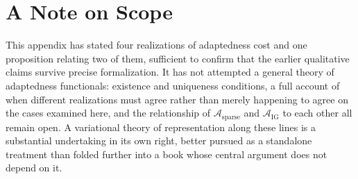 \documentclass[11pt,fleqn]{book}
\numberwithin{equation}{chapter}
\theoremstyle{plain}
\theoremstyle{definition}
\theoremstyle{remark}
\begin{document}
\section{A Note on Scope}

This appendix has stated four realizations of adaptedness cost and one proposition relating two of them, sufficient to confirm that the earlier qualitative claims survive precise formalization. It has not attempted a general theory of adaptedness functionals: existence and uniqueness conditions, a full account of when different realizations must agree rather than merely happening to agree on the cases examined here, and the relationship of \(\mathcal A_{\mathrm{sparse}}\) and \(\mathcal A_{\mathrm{IG}}\) to each other all remain open. A variational theory of representation along these lines is a substantial undertaking in its own right, better pursued as a standalone treatment than folded further into a book whose central argument does not depend on it.


\backmatter

\end{document}
